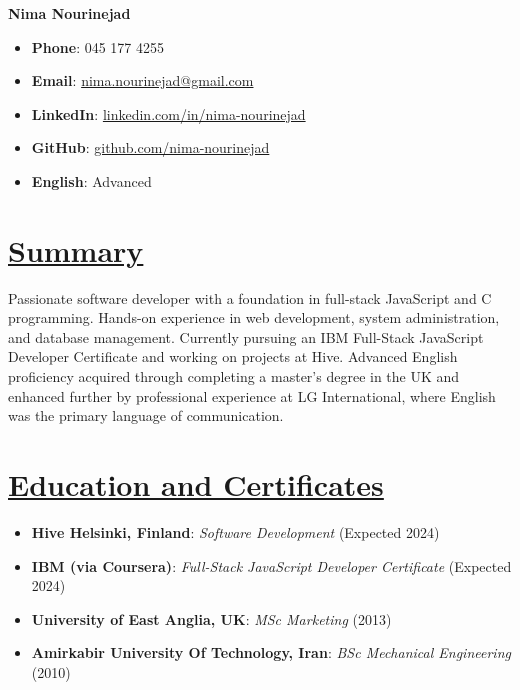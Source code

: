 \documentclass[a4paper,9pt]{article}
\newcommand{\mainsection}[1]{\underline{#1}}
\begin{document}
\noindent
\begin{minipage}[t]{0.5\textwidth}
  \textbf{\huge Nima Nourinejad}\\
\end{minipage}%
\begin{minipage}[t]{0.5\textwidth}
  \raggedleft
  \begin{itemize}[label={},leftmargin=*,noitemsep]
    \item \textbf{Phone}: 045 177 4255
    \item \textbf{Email}: \href{mailto:nima.nourinejad@gmail.com}{nima.nourinejad@gmail.com}
    \item \textbf{LinkedIn}: \href{https://linkedin.com/in/nima-nourinejad}{linkedin.com/in/nima-nourinejad}
    \item \textbf{GitHub}: \href{https://github.com/nima-nourinejad}{github.com/nima-nourinejad}
    \item \textbf{English}: Advanced
  \end{itemize}
\end{minipage}

\section*{\mainsection{Summary}}
Passionate software developer with a foundation in full-stack JavaScript and C programming. Hands-on experience in
web development, system administration, and database management. Currently pursuing an IBM Full-Stack JavaScript
Developer Certificate and working on projects at Hive. Advanced English proficiency acquired through completing a
master’s degree in the UK and enhanced further by professional experience at LG International, where English was
the primary language of communication.

\section*{\mainsection{Education and Certificates}}
\begin{itemize}[leftmargin=*]
  \item \textbf{Hive Helsinki, Finland}: \textit{Software Development} (Expected 2024)
  \item \textbf{IBM (via Coursera)}: \textit{Full-Stack JavaScript Developer Certificate} (Expected 2024)
  \item \textbf{University of East Anglia, UK}: \textit{MSc Marketing} (2013)
  \item \textbf{Amirkabir University Of Technology, Iran}: \textit{BSc Mechanical Engineering} (2010)
\end{itemize}
\end{document}
